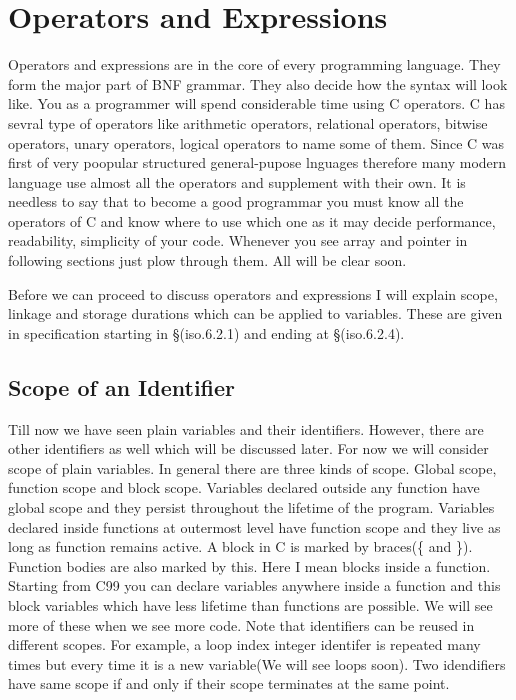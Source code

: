 \chapter{Operators and Expressions}
Operators and expressions are in the core of every programming language. They
form the major part of BNF grammar. They also decide how the syntax will look
like. You as a programmer will spend considerable time using C operators. C has
sevral type of operators like arithmetic operators, relational operators,
bitwise operators, unary operators, logical operators to name some of them.
Since C was first of very poopular structured general-pupose lnguages therefore
many modern language use almost all the operators and supplement with their own.
It is needless to say that to become a good programmar you must know all the
operators of C and know where to use which one as it may decide performance,
readability, simplicity of your code. Whenever you see array and pointer in
following sections just plow through them. All will be clear soon.

Before we can proceed to discuss operators and expressions I will explain
scope, linkage and storage durations which can be applied to
variables. These are given in specification starting in \S(iso.6.2.1) and ending at
\S(iso.6.2.4).

\section{Scope of an Identifier}
Till now we have seen plain variables and their identifiers. However, there are
other identifiers as well which will be discussed later. For now we will
consider scope of plain variables. In general there are three kinds of
scope. Global scope, function scope and block scope. Variables declared outside
any function have global scope and they persist throughout the lifetime of the
program. Variables declared inside functions at outermost level have function
scope and they live as long as function remains active. A block in C is marked
by braces(\{ and \}). Function bodies are also marked by this. Here I mean
blocks inside a function. Starting from C99 you can declare variables anywhere
inside a function and this block variables which have less lifetime than
functions are possible. We will see more of these when we see more code. Note
that identifiers can be reused in different scopes. For example, a loop index
integer identifer is repeated many times but every time it is a new
variable(We will see loops soon). Two idendifiers have same scope if and only
if their scope terminates at the same point.

